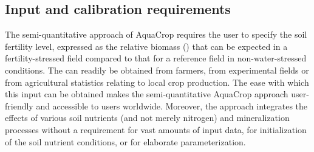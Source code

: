 \subsection{Input and calibration requirements}
The semi-quantitative approach of AquaCrop requires the user to specify the soil fertility level, expressed as the relative biomass (\Brel) that can be expected in a fertility-stressed field compared to that for a reference field in non-water-stressed conditions. The \Brel can readily be obtained from farmers, from experimental fields or from agricultural statistics relating to local crop production. The ease with which this input can be obtained makes the semi-quantitative AquaCrop approach user-friendly and accessible to users worldwide. Moreover, the approach integrates the effects of various soil nutrients (and not merely nitrogen) and mineralization processes without a requirement for vast amounts of input data, for initialization of the soil nutrient conditions, or for elaborate parameterization.

